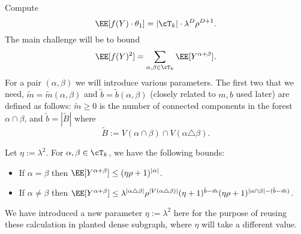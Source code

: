 \documentclass[11pt]{article}
\begin{document}
Compute
\[ \EE[f(Y) \cdot \theta_1] = |\cT_k| \cdot \lambda^D \rho^{D+1}. \]
The main challenge will be to bound
\begin{equation}\label{eq:f-var}
\EE[f(Y)^2] = \sum_{\alpha,\beta \in \cT_k} \EE[Y^{\alpha+\beta}].
\end{equation}
For a pair $(\alpha,\beta)$ we will introduce various parameters. The first two that we need, $\tilde{m} = \tilde{m}(\alpha,\beta)$ and $\tilde{b} = \tilde{b}(\alpha,\beta)$ (closely related to $m,b$ used later) are defined as follows: $\tilde{m} \ge 0$ is the number of connected components in the forest $\alpha \cap \beta$, and $\tilde{b} = |\tilde{B}|$ where
\[ \tilde{B} := V(\alpha \cap \beta) \cap V(\alpha \triangle \beta). \]

\begin{lemma}\label{lem:Y-moments}
Let $\eta := \lambda^2$. For $\alpha,\beta \in \cT_k$, we have the following bounds:
\begin{itemize}
    \item If $\alpha = \beta$ then $\EE[Y^{\alpha+\beta}] \le (\eta \rho + 1)^{|\alpha|}$.
    \item If $\alpha \ne \beta$ then $\EE[Y^{\alpha+\beta}] \le \lambda^{|\alpha \triangle \beta|} \rho^{|V(\alpha \triangle \beta)|} (\eta + 1)^{\tilde{b}-\tilde{m}} (\eta \rho + 1)^{|\alpha \cap \beta| - (\tilde{b} - \tilde{m})}$.
\end{itemize}
\end{lemma}

\noindent We have introduced a new parameter $\eta := \lambda^2$ here for the purpose of reusing these calculation in planted dense subgraph, where $\eta$ will take a different value.
\end{document}
